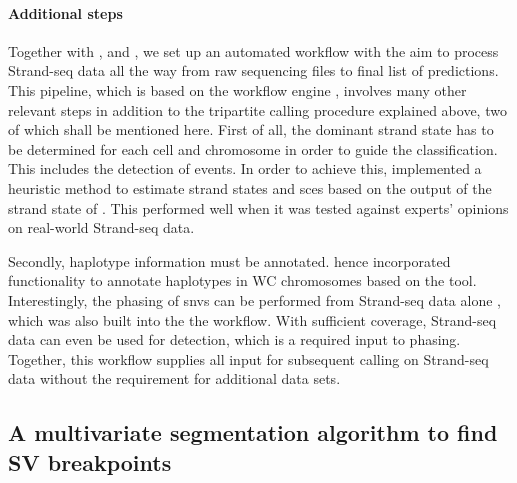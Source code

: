 \paragraph{Additional steps}
Together with \maryam, \marschall and \david, we set up an automated workflow
with the aim to process Strand-seq data all the way from raw sequencing files to
final list of \sv predictions. This pipeline, which is based on the workflow
engine \snakemake, involves many other relevant steps in addition to the
tripartite calling procedure explained above, two of which shall be mentioned
here. First of all, the dominant strand state has to be determined for each cell
and chromosome in order to guide the \sv classification. This includes the
detection of \sce events. In order to achieve this, \venla implemented a
heuristic method to estimate strand states and \acp{sce} based on the output of
the strand state \hmm of \mc. This performed well when it was tested against experts'
opinions on real-world Strand-seq data.

Secondly, haplotype information must be
annotated. \david hence incorporated functionality to annotate haplotypes in WC
chromosomes based on the \strandphaser tool. Interestingly, the phasing of \acp{snv}
can be performed from Strand-seq data alone \citep{Porubsky2016}, which was also
built into the the workflow. With sufficient coverage, Strand-seq data can
even be used for \snv detection, which is a required input to phasing. Together,
this workflow supplies all input for subsequent \sv calling on Strand-seq data
without the requirement for additional data sets.






\subsection{A multivariate segmentation algorithm to find SV breakpoints}
\label{sec:mosaic_segmentation}

